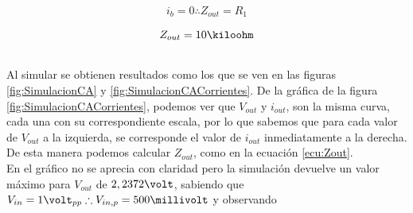 \documentclass[12pt,letterpaper]{article}     %
\begin{document}
\begin{equation}
	i_b = 0
	\therefore
	Z_{out}=
	R_1
\end{equation}

\begin{equation}
	Z_{out}=
	10\kiloohm
\end{equation}

\subsection{}

Al simular se obtienen resultados como los que se ven en las figuras
\ref{fig:SimulacionCA} y \ref{fig:SimulacionCACorrientes}.
De la gráfica de la figura \ref{fig:SimulacionCACorrientes}, podemos
ver que $V_{out}$ y $i_{out}$, son la misma curva,
cada una con su correspondiente escala, por lo que sabemos que
para cada valor de $V_{out}$ a la izquierda,
se corresponde el valor de $i_{out}$ inmediatamente a la derecha.
De esta manera podemos calcular $Z_{out}$, como en la ecuación \ref{ecu:Zout}.\\
En el gráfico no se aprecia con claridad pero la simulación devuelve
un valor máximo para $V_{out}$ de $2,2372\volt$, sabiendo que 
$V_{in}=1\volt_{pp}\therefore V_{in,p}=500\millivolt$ y observando
\end{document}
